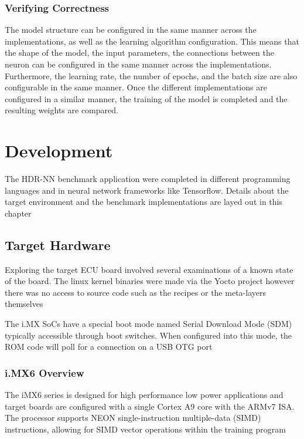 \subsection[Verifying Correctness]{Verifying Correctness}

The model structure can be configured in the same manner across the implementations, as well as the learning algorithm configuration. This means that the shape of the model, the input parameters, the connections between the neuron can be configured in the same manner across the implementations. Furthermore, the learning rate, the number of epochs, and the batch size are also configurable in the same manner. Once the different implementations are configured in a similar manner, the training of the model is completed and the resulting weights are compared.

\chapter{Development}

The HDR-NN benchmark application were completed in different programming languages and in neural network frameworks like Tensorflow. Details about the target environment and the benchmark implementations are layed out in this chapter

\section[iMX6 Custom Board Target]{Target Hardware}

Exploring the target ECU board involved several examinations of a known state of the board. The linux kernel binaries were made via the Yocto project however there was no access to source code such as the recipes or the meta-layers themselves

The i.MX SoCs have a special boot mode named Serial Download Mode (SDM) typically accessible through boot switches. When configured into this mode, the ROM code will poll for a connection on a USB OTG port

\subsection[ECU / iMX6 Evaluation Board Overview]{i.MX6 Overview}

The iMX6 series is designed for high performance low power applications and target boards are configured with a single Cortex A9 core with the ARMv7 ISA. The processor supports NEON single-instruction multiple-data (SIMD) instructions, allowing for SIMD vector operations within the training program

